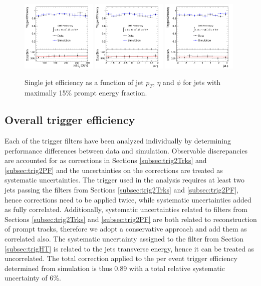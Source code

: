 \begin{figure}[!h]
\centering
 \includegraphics[width=0.32\textwidth]{plots/trigger/effHT300_PF_Pt.pdf}
 \includegraphics[width=0.32\textwidth]{plots/trigger/effHT300_PF_Eta.pdf}
 \includegraphics[width=0.32\textwidth]{plots/trigger/effHT300_PF_Phi.pdf}
\caption{Single jet efficiency as a function of jet $p_T$, $\eta$ and $\phi$ for jets with maximally 15\% prompt energy fraction. \label{fig:eff2PFptetaphi}}
\end{figure}

\subsection{Overall trigger efficiency}

Each of the trigger filters have been analyzed individually by determining performance differences 
between data and simulation. Observable discrepancies are accounted for as corrections in Sections
 \ref{subsec:trig2Trks} and \ref{subsec:trig2PF} and the uncertainties on the corrections are treated as 
systematic uncertainties. The trigger used in the analysis requires
 at least two jets passing the filters from Sections \ref{subsec:trig2Trks} and \ref{subsec:trig2PF}, 
hence corrections need to be applied twice, while systematic uncertainties added as fully correlated. 
Additionally, systematic uncertainties related to filters from Sections 
\ref{subsec:trig2Trks} and \ref{subsec:trig2PF} are both related to reconstruction of prompt tracks, therefore
 we adopt a conservative approach and add them as correlated also. The systematic uncertainty assigned to 
the filter from Section 
\ref{subsec:trigHT} is related to the jets transverse energy, hence it can be treated as uncorrelated. 
The total correction applied to the per event trigger efficiency determined from simulation is thus 0.89 with a total
relative systematic uncertainty of 6\%. 


